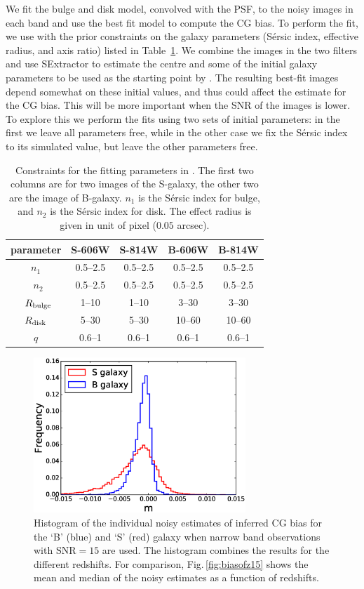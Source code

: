 \documentclass[useAMS,usenatbib]{mnras}
\begin{document}
We fit the bulge and disk model, convolved with the PSF, to  the noisy images in each band and use the best fit model to compute the CG bias. To perform the fit, we use {} \citep{Peng10} with
the prior constraints on the galaxy parameters (S{\'e}rsic index, effective radius, and axis ratio) listed in Table~\ref{fitpar}. We combine the images in the two filters and use {\sc SExtractor} to estimate the centre and some of the initial galaxy parameters to be used as the starting point by {}. The resulting best-fit images depend somewhat on these initial values, and thus could affect the  estimate for the CG bias. This will be more important when the SNR of the images is lower. To explore this we perform the fits using two sets of initial parameters: in the first we leave all parameters free, while in the other case we fix the S{\'e}rsic index to its simulated value, but leave the other parameters free.
%
\begin{table}
\begin{center}
\begin{tabular}{ccc|cc}
\hline\hline
parameter &S-606W  & S-814W  & B-606W & B-814W \\ \hline
$n_1$ &0.5--2.5  &0.5--2.5  &0.5--2.5 &0.5--2.5 \\ \
$n_2$ &0.5--2.5  &0.5--2.5  &0.5--2.5 &0.5--2.5 \\ \
$R_{\rm bulge}$ &1--10 &1--10  &3--30  &3--30  \\
$R_{\rm disk}$  &5--30 &5--30  &10--60 &10--60 \\
$q$      &0.6--1  &0.6--1  &0.6--1 &0.6--1 \\
\hline
\end{tabular}
\caption{\label{fitpar} Constraints for the fitting parameters in {}.
The first two columns are for two images of the S-galaxy, the other two are
the image of B-galaxy.
$n_1$ is the S{\'e}rsic index for bulge, and $n_2$ is the S{\'e}rsic index for disk.
The effect radius is given in unit of pixel ($0.05$ arcsec).}
\end{center}
\end{table}
%
\begin{figure}
  \includegraphics[width=8.0cm]{zs2n15his.eps}
  \caption{Histogram of the individual noisy estimates of inferred CG
    bias for the `B' (blue) and `S' (red) galaxy when narrow band
    observations with $\mathrm{SNR}=15$ are used. The histogram
    combines the results for the different redshifts. For comparison,
    Fig.\,\ref{fig:biasofz15} shows the mean and median of the noisy
    estimates as a function of redshifts.}
  \label{fig:histogrambias}
\end{figure}
\end{document}
